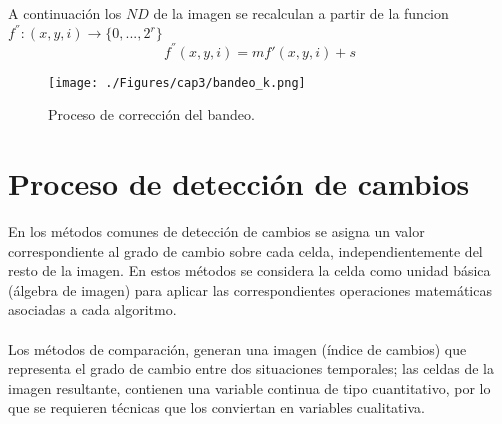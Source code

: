 A continuaci\'on los $ ND $ de la imagen se recalculan a partir de la funcion $ f^{''}:(x,y,i) \longrightarrow \{0,...,2^{r}\} $
				\begin{equation}
				f^{''}(x,y,i) = m f'(x,y,i) + s
				\end{equation} 				

    \begin{figure}[H]
    	\centering
    	\texttt{[image: ./Figures/cap3/bandeo\_k.png]}
    	\caption{Proceso de correcci\'on del bandeo.}
    	\label{fig:bandeado}
    \end{figure}

\section{Proceso de detecci\'on de cambios}
En los m\'etodos comunes de detecci\'on de cambios se asigna un valor correspondiente al grado de cambio sobre cada celda, independientemente del resto de la imagen. En estos m\'etodos se considera la celda como unidad b\'asica (\'algebra de imagen) para aplicar las correspondientes operaciones matem\'aticas asociadas a cada algoritmo.\\~\\
Los m\'etodos de comparaci\'on, generan una imagen (\'indice de cambios) que representa el grado de cambio entre dos situaciones temporales; las celdas de la imagen resultante, contienen una variable continua de tipo cuantitativo, por lo que se requieren t\'ecnicas que los conviertan en variables cualitativa\cite{martinez2013normalizacion}.
